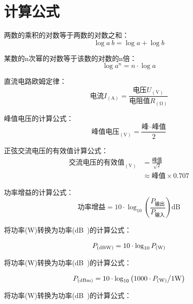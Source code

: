 \newpage

\section{计算公式}

两数的乘积的对数等于两数的对数之和：
\[\log a\: b=\log a+\log b\]

某数的n次幂的对数等于该数的对数的n倍：
\[\log a^n =n \cdot \log a\]

直流电路欧姆定律：
\[\mbox{电流}I_{(\unit{\ampere})} = \frac{\mbox{电压}U_{(\unit{\volt})}}{\mbox{电阻值}R_{(\unit{\ohm})}}\]

峰值电压的计算公式：
\[\mbox{峰值电压}_{(\unit{\volt})} = \frac{\mbox{峰--峰值}}{2}\]

正弦交流电压的有效值计算公式：
\begin{equation*}
	\begin{aligned}
		\mbox{交流电压的有效值}_{(\unit{\volt})} & =\frac{\mbox{峰值}}{\sqrt{2}}   \\
		                                 & \approx \mbox{峰值}\times 0.707
	\end{aligned}
\end{equation*}

功率增益的计算公式：
\[\mbox{功率增益}= 10 \cdot \log_{10} \left( {\frac{P_{ \mbox{输出} }}{P_{ \mbox{输入} }}}\right) \unit{\dB}\]

将功率(\unit{\watt})转换为功率(\unit[qualifier-mode=combine]{\deci\bel{}})的计算公式：

\begin{equation*}
	\begin{aligned}
		P_{(\unit[qualifier-mode=combine]{\deci\bel\of{W}})} & = 10 \cdot \log_{10} P_{(\unit{\watt})} \\
	\end{aligned}
\end{equation*}

将功率(\unit{\watt})转换为功率(\unit[qualifier-mode=combine]{\deci\bel{}})的计算公式：

\begin{equation*}
	\begin{aligned}
		P_{(\unit[qualifier-mode=combine]{\deci\bel\of{m}})} & = 10 \cdot \log_{10} \left( 1000 \cdot P_{(\unit{\watt})} \middle/ 1 \unit{\watt} \right) \\
	\end{aligned}
\end{equation*}

将功率(\unit{\watt})转换为功率(\unit[qualifier-mode=combine]{\deci\bel{}})的计算公式：

